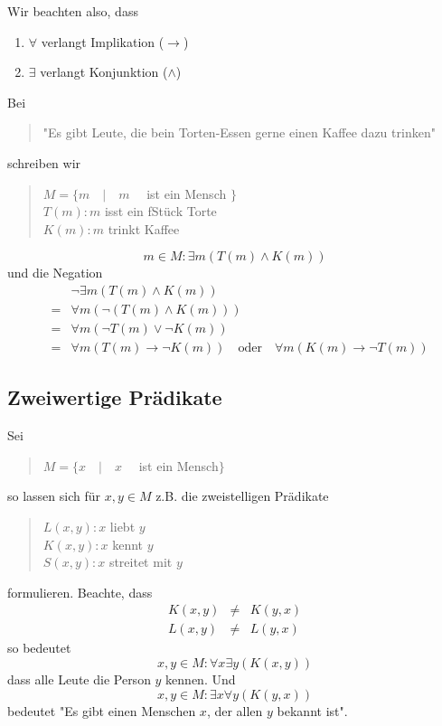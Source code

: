 \documentclass{report}
\begin{document}
Wir beachten also, dass
\begin{enumerate} \item $\forall$ verlangt Implikation ($\to$)
\item $\exists$ verlangt Konjunktion ($\land$)\end{enumerate}
Bei
\begin{quote}"Es gibt Leute, die bein Torten-Essen gerne einen Kaffee dazu trinken"\end{quote}
schreiben wir
\begin{quote}$M = \{ m \quad | \quad m \quad$ ist ein Mensch $\}$\\
$T(m) : m$ isst ein fStück Torte\\
$K(m) : m$ trinkt Kaffee\end{quote}
\begin{equation}m \in M : \exists m (T(m) \land K(m))\end{equation}
und die Negation
\begin{eqnarray}& &\lnot \exists m (T(m) \land K(m)) \nonumber \\
&=& \forall m (\lnot (T(m) \land K(m))) \nonumber \\
&=& \forall m (\lnot T(m) \lor \lnot K(m)) \nonumber \\
&=& \forall m (T(m) \to \lnot K(m)) \quad \mbox{oder} \quad \forall m (K(m) \to \lnot T(m)) \end{eqnarray}
\subsection{Zweiwertige Prädikate}
Sei
\begin{quote}$M = \{x \quad | \quad x \quad$ ist ein Mensch$\}$\end{quote}
so lassen sich für $x,y \in M$ z.B. die zweistelligen Prädikate
\begin{quote}$L(x,y) : x$ liebt $y$\\
$K(x,y) : x$ kennt $y$\\
$S(x,y) : x$ streitet mit $y$\end{quote}
formulieren. Beachte, dass
\begin{eqnarray}K(x,y) & \neq & K(y,x)\nonumber \\
L(x,y) & \neq & L(y,x)\end{eqnarray}
so bedeutet
\begin{equation}x,y \in M : \forall x \exists y (K(x,y))\end{equation}
dass alle Leute die Person $y$ kennen. Und
\begin{equation}x,y \in M : \exists x \forall y (K(y,x))\end{equation}
bedeutet "Es gibt einen Menschen $x$, der allen $y$ bekannt ist".
\end{document}
